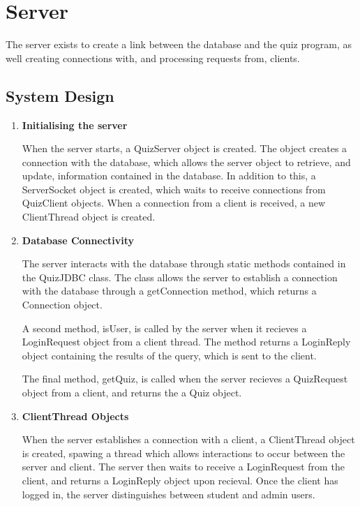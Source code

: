 \section{Server}
\label{sec:server}

The server exists to create a link between the database and the quiz program,
as well creating connections with, and processing requests from, clients.

\subsection{System Design}
\label{sub:system_design}

\begin{enumerate}
	\item \textbf{Initialising the server}

	When the server starts, a QuizServer object is created. The object creates
	a connection with the database, which allows the server object to
	retrieve, and update, information contained in the database. In addition
	to this, a ServerSocket object is created, which waits to receive
	connections from QuizClient objects. When a connection from a client is
	received, a new ClientThread object is created.

	\item \textbf{Database Connectivity}

	The server interacts with the database through static methods contained in
	the QuizJDBC class.  The class allows the server to establish a connection
	with the database through a getConnection method, which  returns a
	Connection object.

	A second method, isUser, is called by the server when it recieves a
	LoginRequest object from a client thread. The method returns a LoginReply
	object containing the results of the query, which is sent to the client.

	The final method, getQuiz, is called when the server recieves a
	QuizRequest object from a client, and returns the a Quiz object.

	\item \textbf{ClientThread Objects}

	When the server establishes a connection with a client, a ClientThread
	object is created, spawing a thread which allows interactions to occur
	between the server and  client. The server then waits to receive a
	LoginRequest from the client, and returns a LoginReply object upon
	recieval.  Once the client has logged in, the server distinguishes between
	student and admin users.


\end{enumerate}
